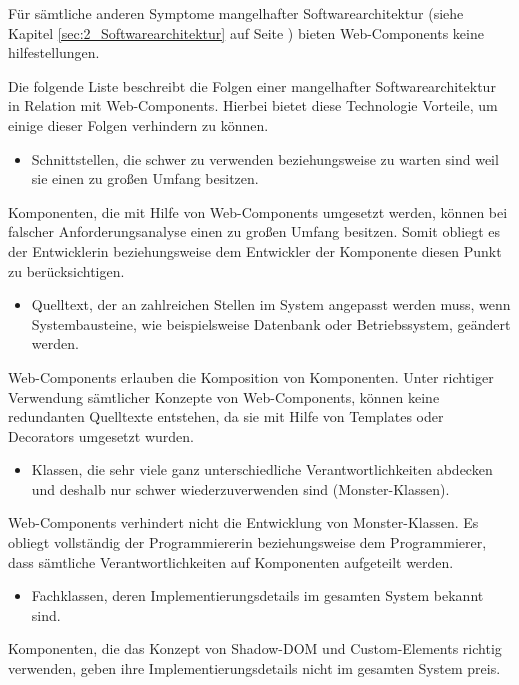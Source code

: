 Für sämtliche anderen Symptome mangelhafter Softwarearchitektur (siehe Kapitel \ref{sec:2_Softwarearchitektur} auf Seite \pageref{sec:2_Softwarearchitektur}) bieten Web-Components keine hilfestellungen.

Die folgende Liste beschreibt die Folgen einer mangelhafter Softwarearchitektur in Relation mit Web-Components. Hierbei bietet diese Technologie Vorteile, um einige dieser Folgen verhindern zu können.

\begin{itemize}
\item Schnittstellen, die schwer zu verwenden beziehungsweise zu warten sind weil sie einen zu großen Umfang besitzen.
\end{itemize}
Komponenten, die mit Hilfe von Web-Components umgesetzt werden, können bei falscher Anforderungsanalyse einen zu großen Umfang besitzen. Somit obliegt es der Entwicklerin beziehungsweise dem Entwickler der Komponente diesen Punkt zu berücksichtigen.

\begin{itemize}
\item Quelltext, der an zahlreichen Stellen im System angepasst werden muss, wenn Systembausteine, wie beispielsweise Datenbank oder Betriebssystem, geändert werden.
\end{itemize}
Web-Components erlauben die Komposition von Komponenten. Unter richtiger Verwendung sämtlicher Konzepte von Web-Components, können keine redundanten Quelltexte entstehen, da sie mit Hilfe von Templates oder Decorators umgesetzt wurden.

\begin{itemize}
\item Klassen, die sehr viele ganz unterschiedliche Verantwortlichkeiten abdecken und deshalb nur schwer wiederzuverwenden sind (\glqq Monster\grqq -Klassen).
\end{itemize}
Web-Components verhindert nicht die Entwicklung von \glqq Monster\grqq -Klassen. Es obliegt vollständig der Programmiererin beziehungsweise dem Programmierer, dass sämtliche Verantwortlichkeiten auf Komponenten aufgeteilt werden.

\begin{itemize}
\item Fachklassen, deren Implementierungsdetails im gesamten System bekannt sind.
\end{itemize}
Komponenten, die das Konzept von Shadow-DOM und Custom-Elements richtig verwenden, geben ihre Implementierungsdetails nicht im gesamten System preis.

